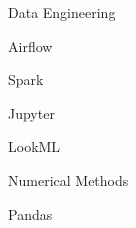 \begin{skillset}{Data Engineering}
  \item Airflow
  \item Spark
  \item Jupyter
  \item LookML
  \item Numerical Methods
  \item Pandas
\end{skillset}
